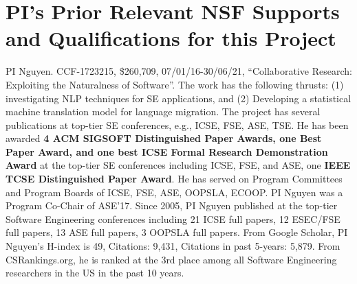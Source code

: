 \section{PI's Prior Relevant NSF Supports and Qualifications for this Project}
\label{prior}

PI Nguyen. CCF-1723215, \$260,709, 07/01/16-30/06/21, ``Collaborative
Research: Exploiting the Naturalness of Software''.
%
 The work has the following
thrusts: (1) investigating NLP techniques for SE
applications, and (2) Developing a statistical machine translation
model for language migration.
%
The project has several publications at top-tier SE
conferences, e.g., ICSE, FSE, ASE, TSE.
%
He has been awarded {\bf 4 ACM SIGSOFT Distinguished Paper Awards, one
  Best Paper Award, and one best ICSE Formal Research Demonstration
  Award} at the top-tier SE conferences including ICSE, FSE, and ASE,
one {\bf IEEE TCSE Distinguished Paper Award}. He has served on
Program Committees and Program Boards of ICSE, FSE, ASE, OOPSLA,
ECOOP. PI Nguyen was a Program Co-Chair of ASE'17. Since 2005, PI
Nguyen published at the top-tier Software Engineering conferences
including 21 ICSE full papers, 12 ESEC/FSE full papers, 13 ASE full
papers, 3 OOPSLA full papers. From Google Scholar, PI
Nguyen's H-index is 49, Citations: 9,431,  Citations in past 5-years: 5,879. From CSRankings.org, he
is ranked at the 3rd place among all Software Engineering researchers
in the US in the past 10 years.

